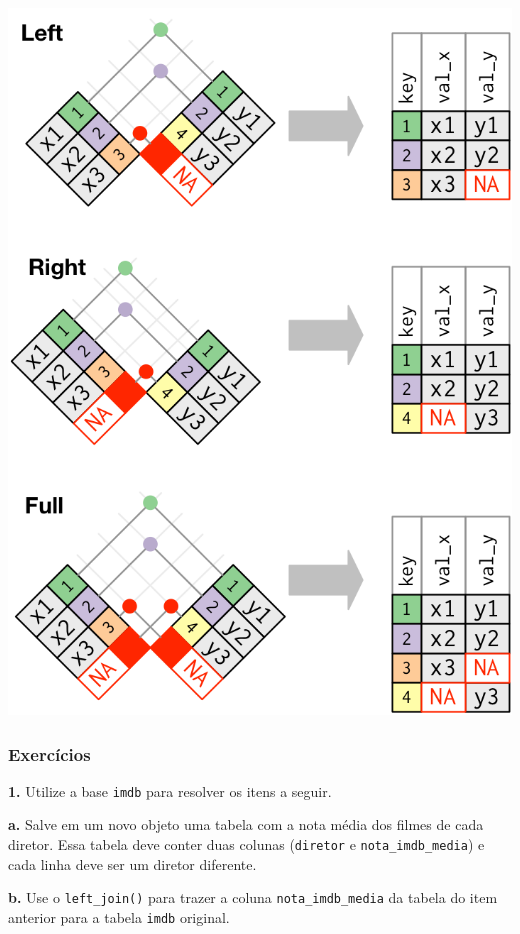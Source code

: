 \documentclass[
]{book}
\begin{document}
\begin{center}\includegraphics[width=9.86in]{assets/img/manipulacao/joins} \end{center}

\hypertarget{exercuxedcios-16}{%
\subsubsection*{Exercícios}\label{exercuxedcios-16}}

\textbf{1.} Utilize a base \texttt{imdb} para resolver os itens a seguir.

\textbf{a.} Salve em um novo objeto uma tabela com a
nota média dos filmes de cada diretor. Essa tabela
deve conter duas colunas (\texttt{diretor} e \texttt{nota\_imdb\_media})
e cada linha deve ser um diretor diferente.

\textbf{b.} Use o \texttt{left\_join()} para trazer a coluna
\texttt{nota\_imdb\_media} da tabela do item anterior
para a tabela \texttt{imdb} original.
\end{document}
